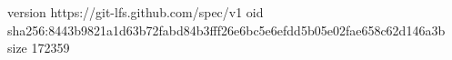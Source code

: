 version https://git-lfs.github.com/spec/v1
oid sha256:8443b9821a1d63b72fabd84b3fff26e6bc5e6efdd5b05e02fae658c62d146a3b
size 172359
